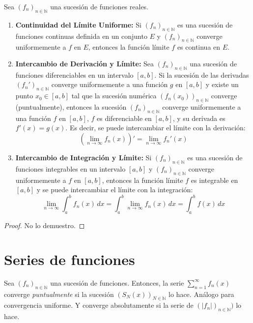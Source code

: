 \begin{proposition}
	Sea $(f_n)_{n \in \mathbb{N}}$ una sucesión de funciones reales.
	\begin{enumerate}
		\item \textbf{Continuidad del Límite Uniforme:} Si $(f_n)_{n \in \mathbb{N}}$ es una sucesión de funciones continuas definida en un conjunto $E$ y $(f_n)_{n \in \mathbb{N}}$ converge uniformemente a $f$ en $E$, entonces la función límite $f$ es continua en $E$.
		\item \textbf{Intercambio de Derivación y Límite:} Sea $(f_n)_{n \in \mathbb{N}}$ una sucesión de funciones diferenciables en un intervalo $[a,b]$. Si la sucesión de las derivadas $(f_n')_{n \in \mathbb{N}}$ converge uniformemente a una función $g$ en $[a,b]$ y existe un punto $x_0 \in [a,b]$ tal que la sucesión numérica $(f_n(x_0))_{n \in \mathbb{N}}$ converge (puntualmente), entonces la sucesión $(f_n)_{n \in \mathbb{N}}$ converge uniformemente a una función $f$ en $[a,b]$, $f$ es diferenciable en $[a,b]$, y su derivada es $f'(x) = g(x)$. Es decir, se puede intercambiar el límite con la derivación:
		      $$\left( \lim_{n \to \infty} f_n(x) \right)' = \lim_{n \to \infty} f_n'(x)$$
		\item \textbf{Intercambio de Integración y Límite:} Si $(f_n)_{n \in \mathbb{N}}$ es una sucesión de funciones integrables en un intervalo $[a,b]$ y $(f_n)_{n \in \mathbb{N}}$ converge uniformemente a $f$ en $[a,b]$, entonces la función límite $f$ es integrable en $[a,b]$ y se puede intercambiar el límite con la integración:
		      $$\lim_{n \to \infty} \int_a^b f_n(x) \, dx = \int_a^b \lim_{n \to \infty} f_n(x) \, dx = \int_a^b f(x) \, dx$$
	\end{enumerate}
\end{proposition}

\begin{proof}
	No lo demuestro.
\end{proof}

\section{Series de funciones}

\begin{definition}
	Sea $(f_n)_{n \in \mathbb{N}}$ una sucesión de funciones. Entonces, la serie $\sum_{n = 1}^{\infty} f_n(x)$ converge \emph{puntualmente} si la sucesión $(S_{N}(x))_{N \in \mathbb{N}}$ lo hace. Análogo para convergencia uniforme. Y converge absolutamente si la serie de $(\left\lvert f_n \right\rvert)_{n \in \mathbb{N}})$ lo hace.
\end{definition}

